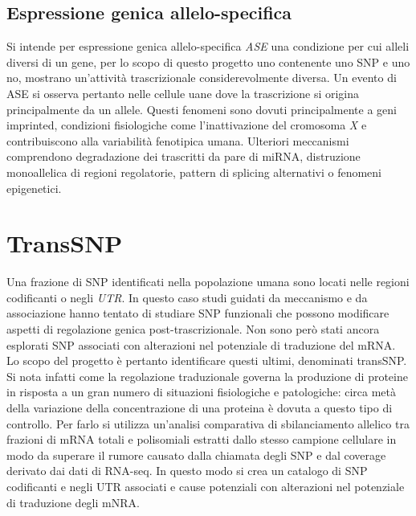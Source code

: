 \subsection{Espressione genica allelo-specifica}
Si intende per espressione genica allelo-specifica \emph{ASE} una condizione per cui alleli diversi di un gene, per lo scopo di questo progetto uno contenente uno SNP e uno no, mostrano un'attivit\`a trascrizionale considerevolmente diversa.
Un evento di ASE si osserva pertanto nelle cellule uane dove la trascrizione si origina principalmente da un allele.
Questi fenomeni sono dovuti principalmente a geni imprinted, condizioni fisiologiche come l'inattivazione del cromosoma \emph{X} e contribuiscono alla variabilit\`a fenotipica umana.
Ulteriori meccanismi comprendono degradazione dei trascritti da pare di miRNA, distruzione monoallelica di regioni regolatorie, pattern di splicing alternativi o fenomeni epigenetici.

\section{TransSNP}
Una frazione di SNP identificati nella popolazione umana sono locati nelle regioni codificanti o negli \emph{UTR}.
In questo caso studi guidati da meccanismo e da associazione hanno tentato di studiare SNP funzionali che possono modificare aspetti di regolazione genica post-trascrizionale.
Non sono per\`o stati ancora esplorati SNP associati con alterazioni nel potenziale di traduzione del mRNA.
Lo scopo del progetto \`e pertanto identificare questi ultimi, denominati transSNP.
Si nota infatti come la regolazione traduzionale governa la produzione di proteine in risposta a un gran numero di situazioni fisiologiche e patologiche: circa met\`a della variazione della concentrazione di una proteina \`e dovuta a questo tipo di controllo.
Per farlo si utilizza un'analisi comparativa di sbilanciamento allelico tra frazioni di mRNA totali e polisomiali estratti dallo stesso campione cellulare in modo da superare il rumore causato dalla chiamata degli SNP e dal coverage derivato dai dati di RNA-seq.
In questo modo si crea un catalogo di SNP codificanti e negli UTR associati e cause potenziali con alterazioni nel potenziale di traduzione degli mNRA.

